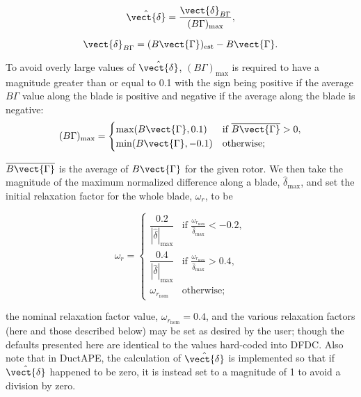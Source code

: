 \begin{equation}
    \hat{\vect{\delta}} = \frac{\vect{\delta}_{B\Gamma}}{(B\Gamma)_\text{max}},
\end{equation}

\where

\begin{equation}
    \vect{\delta}_{B\Gamma} = (B\vect{\Gamma})_\text{est} - B\vect{\Gamma}.
\end{equation}

\noindent To avoid overly large values of \(\hat{\vect{\delta}}\), \((B\Gamma)_\text{max}\) is required to have a magnitude greater than or equal to 0.1 with the sign being positive if the average \(B\Gamma\) value along the blade is positive and negative if the average along the blade is negative:
%
\begin{equation}
    (B\Gamma)_\text{max} =
    \begin{cases}
        \text{max}(B\vect{\Gamma},0.1) & \text{if } \overline{B\vect{\Gamma}} > 0, \\
        \text{min}(B\vect{\Gamma},-0.1) & \text{otherwise};
    \end{cases}
\end{equation}

\where \(\overline{B\vect{\Gamma}}\) is the average of \(B\vect{\Gamma}\) for the given rotor.
%
We then take the magnitude of the maximum normalized difference along a blade, \(\hat{\delta}_\text{max}\), and set the initial relaxation factor for the whole blade, \(\omega_r\), to be

\begin{equation}
    \omega_r =
    \begin{cases}
        \dfrac{0.2}{|\hat{\delta}|_\text{max}} & \text{if } \frac{\omega_{r_\text{nom}}}{\hat{\delta}_\text{max}} < -0.2,
        \\[10pt]
        \dfrac{0.4}{|\hat{\delta}|_\text{max}} & \text{if } \frac{\omega_{r_\text{nom}}}{\hat{\delta}_\text{max}} > 0.4, \\[10pt]
        \omega_{r_\text{nom}} & \text{otherwise};
    \end{cases}
\end{equation}

\where the nominal relaxation factor value, \(\omega_{r_\text{nom}}=0.4\), and the various relaxation factors (here and those described below) may be set as desired by the user; though the defaults presented here are identical to the values hard-coded into DFDC.
%
Also note that in DuctAPE, the calculation of \(\hat{\vect{\delta}}\) is implemented so that if \(\hat{\vect{\delta}}\) happened to be zero, it is instead set to a magnitude of 1 to avoid a division by zero.

